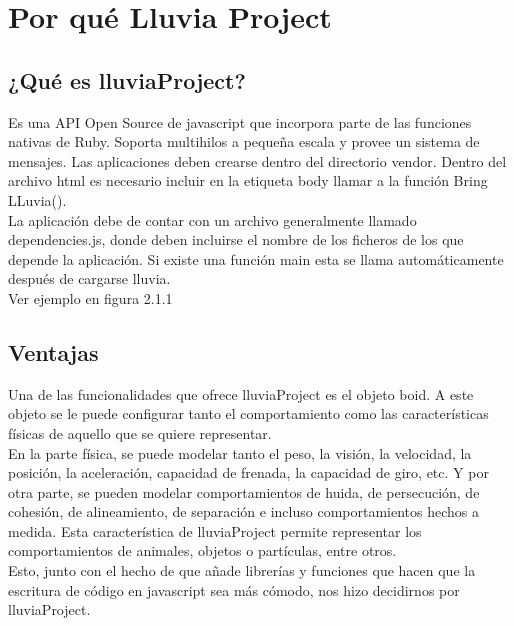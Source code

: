 \section{Por qué Lluvia Project}
\label{section:por_que}

\subsection{¿Qué es lluviaProject?}
\label{subsection:que_es}

Es una API Open Source de javascript  que incorpora parte de las funciones nativas de Ruby. Soporta multihilos a pequeña escala y provee un 
sistema de mensajes. Las aplicaciones deben crearse dentro del directorio vendor. Dentro del archivo html es necesario incluir en la 
etiqueta body llamar a la función Bring LLuvia().\\

La aplicación debe de contar con un archivo generalmente llamado dependencies.js, donde deben incluirse el nombre de los ficheros de los que 
depende la aplicación. Si existe una función main esta se llama automáticamente después de cargarse lluvia.\\

Ver ejemplo en figura 2.1.1


\subsection{Ventajas}
\label{subsection:ventajas}


Una de las funcionalidades que ofrece lluviaProject es el objeto boid. A este objeto se le puede configurar tanto el comportamiento como las 
características físicas de aquello que se quiere representar.\\

En la parte física, se puede modelar tanto el peso, la visión, la velocidad, la posición, la aceleración, capacidad de frenada, la capacidad 
de giro, etc. Y por otra parte, se pueden modelar comportamientos de huida, de persecución, de cohesión, de alineamiento, de separación e 
incluso comportamientos hechos a medida. Esta característica de lluviaProject permite representar los comportamientos de animales, objetos 
o partículas, entre otros.\\

Esto, junto con el hecho de que añade librerías y funciones que hacen que la escritura de código en javascript sea más cómodo, nos hizo 
decidirnos por lluviaProject.\\
